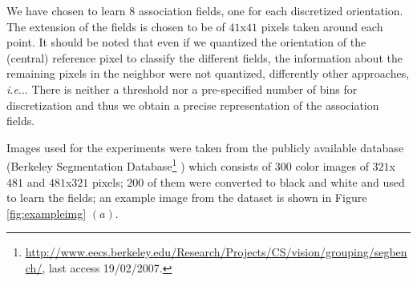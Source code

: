\documentclass{llncs}
\makeatletter
\DeclareRobustCommand\onedot{\futurelet\@let@token\@onedot}
\def\@onedot{\ifx\@let@token.\else.\null\fi\xspace}
\def\ie{\emph{i.e}\onedot} \def\Ie{\emph{I.e}\onedot}
\makeatother
\begin{document}

We have chosen to learn $8$ association fields, one for each discretized
orientation. The extension of the fields is chosen to be of $41$x$41$ pixels
taken around each point.
It should be noted that even if we quantized the orientation of the (central)
reference pixel to classify the different fields, the information about the remaining
pixels in the neighbor were not quantized, differently other approaches, \ie \cite{Sigman01}.
There is neither a threshold nor a pre-specified number of bins for
discretization and thus we obtain a precise representation of the association fields.

Images used for the experiments were taken from the
publicly available database (Berkeley Segmentation
Database\footnote{\url{http://www.eecs.berkeley.edu/Research/Projects/CS/vision/grouping/segbench/}, last access 19/02/2007.}
\cite{MartinFTM01}) which consists of $300$
color images of $321$x$481$ and $481$x$321$ pixels;
$200$ of them were converted to black and white and used
to learn the fields; an
example image from the dataset is shown in Figure \ref{fig:exampleimg} $(a)$.
\end{document}
